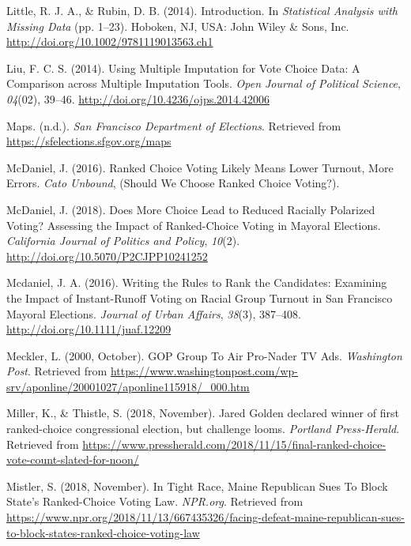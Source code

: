 \documentclass[12pt,twoside]{reedthesis}
\begin{document}
\leavevmode\hypertarget{ref-little_introduction_2014}{}%
Little, R. J. A., \& Rubin, D. B. (2014). Introduction. In \emph{Statistical Analysis with Missing Data} (pp. 1--23). Hoboken, NJ, USA: John Wiley \& Sons, Inc. \url{http://doi.org/10.1002/9781119013563.ch1}

\leavevmode\hypertarget{ref-liu_using_2014}{}%
Liu, F. C. S. (2014). Using Multiple Imputation for Vote Choice Data: A Comparison across Multiple Imputation Tools. \emph{Open Journal of Political Science}, \emph{04}(02), 39--46. \url{http://doi.org/10.4236/ojps.2014.42006}

\leavevmode\hypertarget{ref-noauthor_maps_nodate}{}%
Maps. (n.d.). \emph{San Francisco Department of Elections}. Retrieved from \url{https://sfelections.sfgov.org/maps}

\leavevmode\hypertarget{ref-mcdaniel_ranked_2016}{}%
McDaniel, J. (2016). Ranked Choice Voting Likely Means Lower Turnout, More Errors. \emph{Cato Unbound}, (Should We Choose Ranked Choice Voting?).

\leavevmode\hypertarget{ref-mcdaniel_does_2018}{}%
McDaniel, J. (2018). Does More Choice Lead to Reduced Racially Polarized Voting? Assessing the Impact of Ranked-Choice Voting in Mayoral Elections. \emph{California Journal of Politics and Policy}, \emph{10}(2). \url{http://doi.org/10.5070/P2CJPP10241252}

\leavevmode\hypertarget{ref-mcdaniel_writing_2016}{}%
Mcdaniel, J. A. (2016). Writing the Rules to Rank the Candidates: Examining the Impact of Instant-Runoff Voting on Racial Group Turnout in San Francisco Mayoral Elections. \emph{Journal of Urban Affairs}, \emph{38}(3), 387--408. \url{http://doi.org/10.1111/juaf.12209}

\leavevmode\hypertarget{ref-meckler_gop_2000}{}%
Meckler, L. (2000, October). GOP Group To Air Pro-Nader TV Ads. \emph{Washington Post}. Retrieved from \url{https://www.washingtonpost.com/wp-srv/aponline/20001027/aponline115918/_000.htm}

\leavevmode\hypertarget{ref-miller_jared_2018}{}%
Miller, K., \& Thistle, S. (2018, November). Jared Golden declared winner of first ranked-choice congressional election, but challenge looms. \emph{Portland Press-Herald}. Retrieved from \url{https://www.pressherald.com/2018/11/15/final-ranked-choice-vote-count-slated-for-noon/}

\leavevmode\hypertarget{ref-mistler_tight_2018}{}%
Mistler, S. (2018, November). In Tight Race, Maine Republican Sues To Block State's Ranked-Choice Voting Law. \emph{NPR.org}. Retrieved from \url{https://www.npr.org/2018/11/13/667435326/facing-defeat-maine-republican-sues-to-block-states-ranked-choice-voting-law}
\end{document}
